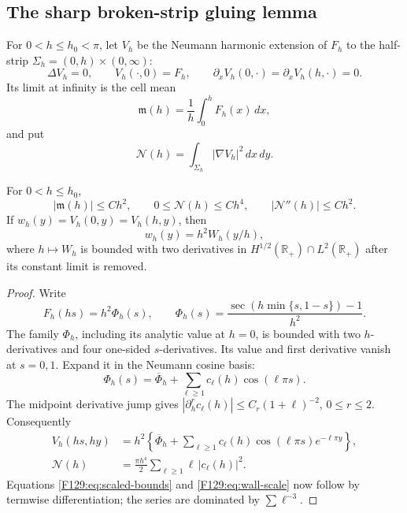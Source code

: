 \subsection{The sharp broken-strip gluing lemma}

For \(0<h\le h_0<\pi\), let \(V_h\) be the Neumann harmonic extension of
\(F_h\) to the half-strip
\(\Sigma_h=(0,h)\times(0,\infty)\):
\begin{equation}\label{F129:eq:strip-problem}
 \Delta V_h=0,\qquad V_h(\cdot,0)=F_h,\qquad
 \partial_xV_h(0,\cdot)=\partial_xV_h(h,\cdot)=0.
\end{equation}
Its limit at infinity is the cell mean
\begin{equation}\label{F129:eq:mean}
 \mathfrak m(h)=\frac1h\int_0^hF_h(x)\,dx,
\end{equation}
and put
\begin{equation}\label{F129:eq:N}
 \mathcal N(h)=\int_{\Sigma_h}|\nabla V_h|^2\,dx\,dy.
\end{equation}

\begin{lemma}\label{F129:lem:scaled}
For \(0<h\le h_0\),
\begin{equation}\label{F129:eq:scaled-bounds}
 |\mathfrak m(h)|\le Ch^2,\qquad
 0\le\mathcal N(h)\le Ch^4,\qquad
 |\mathcal N''(h)|\le Ch^2.
\end{equation}
If \(w_h(y)=V_h(0,y)=V_h(h,y)\), then
\begin{equation}\label{F129:eq:wall-scale}
 w_h(y)=h^2W_h(y/h),
\end{equation}
where \(h\mapsto W_h\) is bounded with two derivatives in
\(H^{1/2}(\mathbb R_+)\cap L^2(\mathbb R_+)\) after its constant limit is
removed.
\end{lemma}

\begin{proof}
Write
\begin{equation}\label{F129:eq:profile}
 F_h(hs)=h^2\Phi_h(s),\qquad
 \Phi_h(s)=\frac{\sec(h\min\{s,1-s\})-1}{h^2}.
\end{equation}
The family \(\Phi_h\), including its analytic value at \(h=0\), is bounded
with two \(h\)-derivatives and four one-sided \(s\)-derivatives.  Its value
and first derivative vanish at \(s=0,1\).  Expand it in the Neumann cosine
basis:
\begin{equation}
 \Phi_h(s)=\overline\Phi_h+\sum_{\ell\ge1}c_\ell(h)\cos(\ell\pi s).
\end{equation}
The midpoint derivative jump gives
\(|\partial_h^r c_\ell(h)|\le C_r(1+\ell)^{-2}\), \(0\le r\le2\).
Consequently
\begin{align}
 V_h(hs,hy)
 &=h^2\left\{\overline\Phi_h+
   \sum_{\ell\ge1}c_\ell(h)
   \cos(\ell\pi s)e^{-\ell\pi y}\right\},\label{F129:eq:scaled-V}\\
 \mathcal N(h)
 &=\frac{\pi h^4}{2}\sum_{\ell\ge1}\ell\,|c_\ell(h)|^2.\label{F129:eq:N-series}
\end{align}
Equations \eqref{F129:eq:scaled-bounds} and \eqref{F129:eq:wall-scale} now follow by
termwise differentiation; the series are dominated by
\(\sum\ell^{-3}\).
\end{proof}

